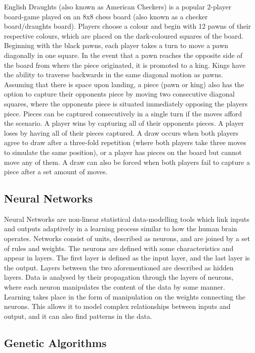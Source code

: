 \documentclass[12pt,a4paper]{article}
\begin{document}
    English Draughts (also known as American Checkers) is a popular 2-player board-game played on an 8x8 chess board (also known as a checker board/draughts board). Players choose a colour and begin with 12 pawns of their respective colours, which are placed on the dark-coloured squares of the board. Beginning with the black pawns, each player takes a turn to move a pawn diagonally in one square. In the event that a pawn reaches the opposite side of the board from where the piece originated, it is promoted to a king. Kings have the ability to traverse backwards in the same diagonal motion as pawns. Assuming that there is space upon landing, a piece (pawn or king) also has the option to capture their opponents piece by moving two consecutive diagonal squares, where the opponents piece is situated immediately opposing the players piece. Pieces can be captured consecutively in a single turn if the moves afford the scenario. A player wins by capturing all of their opponents pieces. A player loses by having all of their pieces captured. A draw occurs when both players agree to draw after a three-fold repetition (where both players take three moves to simulate the same position), or a player has pieces on the board but cannot move any of them. A draw can also be forced when both players fail to capture a piece after a set amount of moves.

    \subsection{Neural Networks}

    Neural Networks are non-linear statistical data-modelling tools which link inputs and outputs adaptively in a learning process similar to how the human brain operates. Networks consist of units, described as neurons, and are joined by a set of rules and weights. The neurons are defined with some characteristics and appear in layers. The first layer is defined as the input layer, and the last layer is the output. Layers between the two aforementioned are described as hidden layers. Data is analysed by their propagation through the layers of neurons, where each neuron manipulates the content of the data by some manner. Learning takes place in the form of manipulation on the weights connecting the neurons. This allows it to model complex relationships between inputs and output, and it can also find patterns in the data. 

 	\subsection{Genetic Algorithms}
\end{document}
